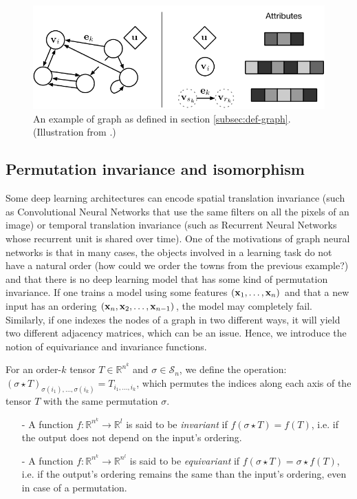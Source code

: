 \documentclass{article}
\begin{document}
\begin{figure}
    \centering
    \includegraphics{images/attributes.pdf}
    \caption{An example of graph as defined in section \ref{subsec:def-graph}. (Illustration from \cite{battaglia2018relational}.)}
    \label{fig:def-graph}
\end{figure}

    \subsection{Permutation invariance and isomorphism}
    \label{subsec:perm-invariance}

Some deep learning architectures can encode spatial translation invariance (such as Convolutional Neural Networks that use the same filters on all the pixels of an image) or temporal translation invariance (such as Recurrent Neural Networks whose recurrent unit is shared over time). One of the motivations of graph neural networks is that in many cases, the objects involved in a learning task do not have a natural order (how could we order the towns from the previous example?) and that there is no deep learning model that has some kind of permutation invariance. If one trains a model using some features $\left( \mathbf{x}_1, \dots, \mathbf{x}_n \right)$ and that a new input has an ordering $\left( \mathbf{x}_n, \mathbf{x}_2, \dots, \mathbf{x}_{n-1} \right)$, the model may completely fail. Similarly, if one indexes the nodes of a graph in two different ways, it will yield two different adjacency matrices, which can be an issue. Hence, we introduce the notion of equivariance and invariance functions.

For an order-$k$ tensor $T \in \mathbb{R}^{n^k}$ and $\sigma \in \mathcal{S}_n$, we define the operation: $\left( \sigma \star T \right)_{\sigma(i_1), \dots, \sigma(i_k)} = T_{i_1, \dots, i_k}$, which permutes the indices along each axis of the tensor $T$ with the same permutation $\sigma$.

\begin{itemize}
    \item[-] A function $f: \mathbb{R}^{n^k} \rightarrow \mathbb{R}^l$ is said to be \emph{invariant} if $f \left( \sigma \star T \right) = f \left( T \right)$, i.e. if the output does not depend on the input's ordering.
    
    \item[-] A function $f: \mathbb{R}^{n^k} \rightarrow \mathbb{R}^{n^l}$ is said to be \emph{equivariant} if $f \left( \sigma \star T \right) = \sigma \star f \left( T \right)$, i.e. if the output's ordering remains the same than the input's ordering, even in case of a permutation.
\end{itemize}
\end{document}
